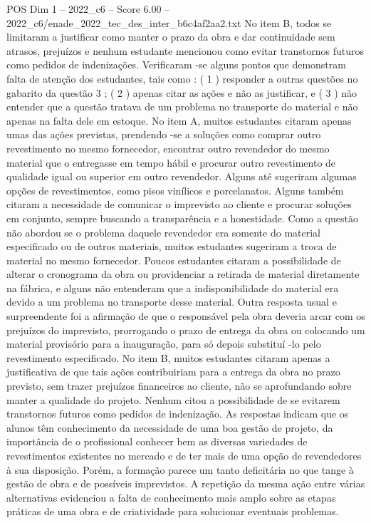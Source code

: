 \begin{textsample}{POS Dim 1 – 2022\_c6 – Score 6.00 – 2022\_c6/enade\_2022\_tec\_des\_inter\_b6c4af2aa2.txt}
No item B, todos se limitaram a justificar como manter o prazo da obra e dar continuidade sem atrasos, prejuízos e nenhum estudante mencionou como evitar transtornos futuros como pedidos de indenizações.
Verificaram -se alguns pontos que demonstram falta de atenção dos estudantes, tais como : ( 1 ) responder a outras questões no gabarito da questão 3 ; ( 2 ) apenas citar as ações e não as justificar, e ( 3 ) não entender que a questão tratava de um problema no transporte do material e não apenas na falta dele em estoque.
No item A, muitos estudantes citaram apenas umas das ações previstas, prendendo -se a soluções como comprar outro revestimento no mesmo fornecedor, encontrar outro revendedor do mesmo material que o entregasse em tempo hábil e procurar outro revestimento de qualidade igual ou superior em outro revendedor.
Alguns até sugeriram algumas opções de revestimentos, como pisos vinílicos e porcelanatos.
Alguns também citaram a necessidade de comunicar o imprevisto ao cliente e procurar soluções em conjunto, sempre buscando a transparência e a honestidade.
Como a questão não abordou se o problema daquele revendedor era somente do material especificado ou de outros materiais, muitos estudantes sugeriram a troca de material no mesmo fornecedor.
Poucos estudantes citaram a possibilidade de alterar o cronograma da obra ou providenciar a retirada de material diretamente na fábrica, e alguns não entenderam que a indisponibilidade do material era devido a um problema no transporte desse material.
Outra resposta usual e surpreendente foi a afirmação de que o responsável pela obra deveria arcar com os prejuízos do imprevisto, prorrogando o prazo de entrega da obra ou colocando um material provisório para a inauguração, para só depois substituí -lo pelo revestimento especificado.
No item B, muitos estudantes citaram apenas a justificativa de que tais ações contribuiriam para a entrega da obra no prazo previsto, sem trazer prejuízos financeiros ao cliente, não se aprofundando sobre manter a qualidade do projeto.
Nenhum citou a possibilidade de se evitarem transtornos futuros como pedidos de indenização.
As respostas indicam que os alunos têm conhecimento da necessidade de uma boa gestão de projeto, da importância de o profissional conhecer bem as diversas variedades de revestimentos existentes no mercado e de ter mais de uma opção de revendedores à sua disposição.
Porém, a formação parece um tanto deficitária no que tange à gestão de obra e de possíveis imprevistos.
A repetição da mesma ação entre várias alternativas evidenciou a falta de conhecimento mais amplo sobre as etapas práticas de uma obra e de criatividade para solucionar eventuais problemas.

\end{textsample}
